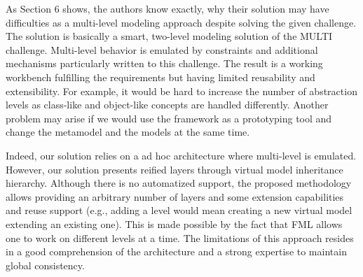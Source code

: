 \documentclass[10pt]{article}
\begin{document}
\begin{response}{As Section 6 shows, the authors know exactly, why their solution may have difficulties as a multi-level modeling approach despite solving the given challenge. The solution is basically a smart, two-level modeling solution of the MULTI challenge. Multi-level behavior is emulated by constraints and additional mechanisms particularly written to this challenge. The result is a working workbench fulfilling the requirements but having limited reusability and extensibility. For example, it would be hard to increase the number of abstraction levels as class-like and object-like concepts are handled differently. Another problem may arise if we would use the framework as a prototyping tool and change the metamodel and the models at the same time.}


Indeed, our solution relies on a ad hoc architecture where multi-level is emulated. However, our solution presents reified layers through virtual model inheritance hierarchy. Although there is no automatized support, the proposed methodology allows providing an arbitrary number of layers and some extension capabilities and reuse support (e.g., adding a level would mean creating a new virtual model extending an existing one). This is made possible by the fact that FML allows one to work on different levels at a time. The limitations of this approach resides in a good comprehension of the architecture and a strong expertise to maintain global consistency.%
\end{response}
\end{document}
